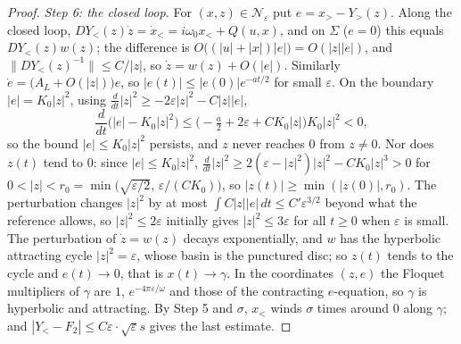 \documentclass[11pt,reqno]{amsart}
\theoremstyle{plain}
\theoremstyle{definition}
\theoremstyle{remark}
\begin{document}
\begin{proof}
\emph{Step 6: the closed loop.} For $(x,z)\in \mathcal N_\varepsilon$ put $e=x_>-Y_>(z)$. Along the closed loop,
$DY_<(z)\dot z=\dot x_<=i\omega_0x_<+Q(u,x)$, and on $\Sigma$ ($e=0$) this equals $DY_<(z)w(z)$; the difference is
$O\bigl((|u|+|x|)|e|\bigr)=O(|z||e|)$, and $\|DY_<(z)^{-1}\|\le C/|z|$, so $\dot z=w(z)+O(|e|)$. Similarly
$\dot e=\bigl(A_L+O(|z|)\bigr)e$, so $|e(t)|\le|e(0)|e^{-at/2}$ for small $\varepsilon$. On the boundary $|e|=K_0|z|^{2}$, using
$\frac{d}{dt}|z|^{2}\ge-2\varepsilon|z|^{2}-C|z||e|$,
\[
  \frac{d}{dt}\bigl(|e|-K_0|z|^{2}\bigr)\le\bigl(-\tfrac a2+2\varepsilon+CK_0|z|\bigr)K_0|z|^{2}<0 ,
\]
so the bound $|e|\le K_0|z|^{2}$ persists, and $z$ never reaches $0$ from $z\ne0$. Nor does $z(t)$ tend to $0$: since $|e|\le K_0|z|^{2}$, $\frac{d}{dt}|z|^{2}\ge2(\varepsilon-|z|^{2})|z|^{2}-CK_0|z|^{3}>0$ for $0<|z|<r_0=\min\bigl(\sqrt{\varepsilon/2},\,\varepsilon/(CK_0)\bigr)$, so $|z(t)|\ge\min(|z(0)|,r_0)$. The perturbation changes $|z|^{2}$ by at most
$\int C|z||e|\,dt\le C'\varepsilon^{3/2}$ beyond what the reference allows, so $|z|^{2}\le2\varepsilon$ initially gives $|z|^{2}\le3\varepsilon$ for
all $t\ge0$ when $\varepsilon$ is small. The perturbation of $\dot z=w(z)$ decays
exponentially, and $w$ has the hyperbolic attracting cycle $|z|^{2}=\varepsilon$, whose basin is the punctured disc; so
$z(t)$ tends to the cycle and $e(t)\to0$, that is $x(t)\to\gamma$. In the coordinates $(z,e)$ the Floquet multipliers of $\gamma$
are $1$, $e^{-4\pi\varepsilon/\omega}$ and those of the contracting $e$-equation, so $\gamma$ is hyperbolic and attracting. By Step 5 and
$\sigma$, $x_<$ winds $\sigma$ times around $0$ along $\gamma$; and $|Y_<-F_2|\le C\varepsilon\cdot\sqrt\varepsilon s$ gives the last estimate.
\end{proof}
\end{document}
